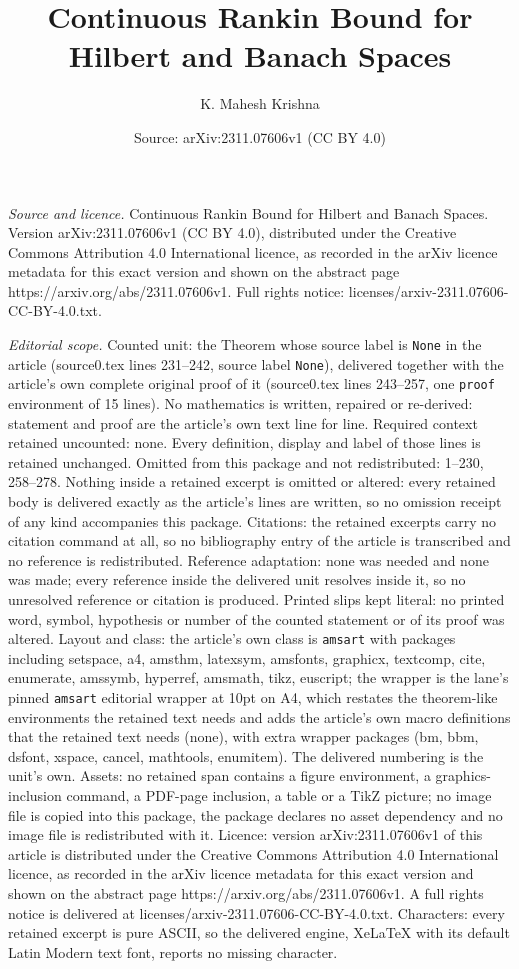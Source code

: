 \documentclass[10pt,a4paper]{amsart}
\title[Continuous Rankin Bound for Hilbert and Banach Spaces]{Continuous Rankin Bound for Hilbert and Banach Spaces}
\author{K. Mahesh Krishna}
\date{Source: arXiv:2311.07606v1 (CC BY 4.0)}
\begin{document}
\maketitle

\noindent\emph{Source and licence.} Continuous Rankin Bound for Hilbert and Banach Spaces. Version arXiv:2311.07606v1 (CC BY 4.0), distributed under the Creative Commons Attribution 4.0 International licence, as recorded in the arXiv licence metadata for this exact version and shown on the abstract page https://arxiv.org/abs/2311.07606v1. Full rights notice: licenses/arxiv-2311.07606-CC-BY-4.0.txt.\par\smallskip

\noindent\textit{Editorial scope.} Counted unit: the Theorem whose source label is \texttt{None} in the article (source0.tex lines 231--242, source label \texttt{None}), delivered together with the article's own complete original proof of it (source0.tex lines 243--257, one \texttt{proof} environment of 15 lines). No mathematics is written, repaired or re-derived: statement and proof are the article's own text line for line. Required context retained uncounted: none. Every definition, display and label of those lines is retained unchanged. Omitted from this package and not redistributed: 1--230, 258--278. Nothing inside a retained excerpt is omitted or altered: every retained body is delivered exactly as the article's lines are written, so no omission receipt of any kind accompanies this package. Citations: the retained excerpts carry no citation command at all, so no bibliography entry of the article is transcribed and no reference is redistributed. Reference adaptation: none was needed and none was made; every reference inside the delivered unit resolves inside it, so no unresolved reference or citation is produced. Printed slips kept literal: no printed word, symbol, hypothesis or number of the counted statement or of its proof was altered. Layout and class: the article's own class is \texttt{amsart} with packages including setspace, a4, amsthm, latexsym, amsfonts, graphicx, textcomp, cite, enumerate, amssymb, hyperref, amsmath, tikz, euscript; the wrapper is the lane's pinned \texttt{amsart} editorial wrapper at 10pt on A4, which restates the theorem-like environments the retained text needs and adds the article's own macro definitions that the retained text needs (none), with extra wrapper packages (bm, bbm, dsfont, xspace, cancel, mathtools, enumitem). The delivered numbering is the unit's own. Assets: no retained span contains a figure environment, a graphics-inclusion command, a PDF-page inclusion, a table or a TikZ picture; no image file is copied into this package, the package declares no asset dependency and no image file is redistributed with it. Licence: version arXiv:2311.07606v1 of this article is distributed under the Creative Commons Attribution 4.0 International licence, as recorded in the arXiv licence metadata for this exact version and shown on the abstract page https://arxiv.org/abs/2311.07606v1. A full rights notice is delivered at licenses/arxiv-2311.07606-CC-BY-4.0.txt. Characters: every retained excerpt is pure ASCII, so the delivered engine, XeLaTeX with its default Latin Modern text font, reports no missing character.
\end{document}
